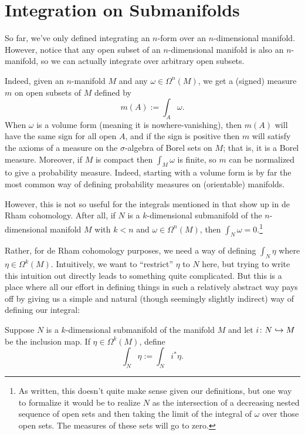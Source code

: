 
\section{Integration on Submanifolds}
\label{sec:integration on submanifolds}

So far, we've only defined integrating an $n$-form over an $n$-dimensional manifold. However, notice that any open subset of an $n$-dimensional manifold is also an $n$-manifold, so we can actually integrate over arbitrary open subsets.

Indeed, given an $n$-manifold $M$ and any $\omega \in \Omega^n(M)$, we get a (signed) measure $m$ on open subsets of $M$ defined by
\[
	m(A):=\int_A \omega.
\]
When $\omega $ is a volume form (meaning it is nowhere-vanishing), then $m(A)$ will have the same sign for all open $A$, and if the sign is positive then $m$ will satisfy the axioms of a measure on the $\sigma$-algebra of Borel sets on $M$; that is, it is a Borel measure. Moreover, if $M$ is compact then $\int_M \omega$ is finite, so $m$ can be normalized to give a probability measure. Indeed, starting with a volume form is by far the most common way of defining probability measures on (orientable) manifolds.

However, this is not so useful for the integrals mentioned in  that show up in de Rham cohomology. After all, if $N$ is a $k$-dimensional submanifold of the $n$-dimensional manifold $M$  with $k < n$ and $\omega \in \Omega^n(M)$, then $\int_N \omega = 0$.\footnote{As written, this doesn't quite make sense given our definitions, but one way to formalize it would be to realize $N$ as the intersection of a decreasing nested sequence of open sets and then taking the limit of the integral of $\omega$ over those open sets. The measures of these sets will go to zero.}

Rather, for de Rham cohomology purposes, we need a way of defining $\int_N \eta$ where $\eta \in \Omega^k(M)$. Intuitively, we want to ``restrict'' $\eta$ to $N$ here, but trying to write this intuition out directly leads to something quite complicated. But this is a place where all our effort in defining things in such a relatively abstract way pays off by giving us a simple and natural (though seemingly slightly indirect) way of defining our integral:

\begin{definition}\label{def:integration on submanifold}
	Suppose $N$ is a $k$-dimensional submanifold of the manifold $M$ and let $i \colon\thinspace\! N \hookrightarrow M$ be the inclusion map. If $\eta \in \Omega^k(M)$, define
	\[
		\int_N \eta := \int_N i^\ast \eta.
	\]
\end{definition}

